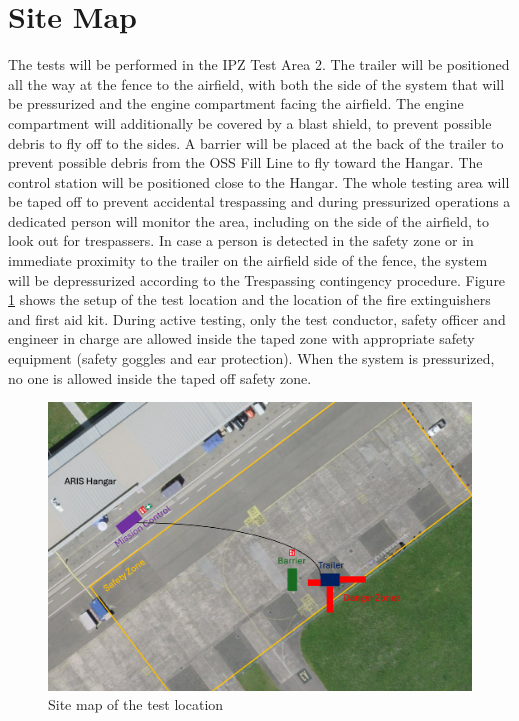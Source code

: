 \documentclass{article}
\begin{document}
\section{Site Map}
The tests will be performed in the IPZ Test Area 2. The trailer will be positioned all the way at the fence to the airfield, with both the side of the system that will be pressurized and the engine compartment facing the airfield. The engine compartment will additionally be covered by a blast shield, to prevent possible debris to fly off to the sides. A barrier will be placed at the back of the trailer to prevent possible debris from the OSS Fill Line to fly toward the Hangar. The control station will be positioned close to the Hangar. The whole testing area will be taped off to prevent accidental trespassing and during pressurized operations a dedicated person will monitor the area, including on the side of the airfield, to look out for trespassers. In case a person is detected in the safety zone or in immediate proximity to the trailer on the airfield side of the fence, the system will be depressurized according to the Trespassing contingency procedure.
Figure \ref{fig:location-plan} shows the setup of the test location and the location of the fire extinguishers and first aid kit. During active testing, only the test conductor, safety officer and engineer in charge are allowed inside the taped zone with appropriate safety equipment (safety goggles and ear protection). When the system is pressurized, no one is allowed inside the taped off safety zone.
\begin{figure}[h]
    \centering
    \includegraphics[width=\textwidth]{assets/location-map.png}
    \caption{Site map of the test location}
    \label{fig:location-plan}
\end{figure}
\end{document}
